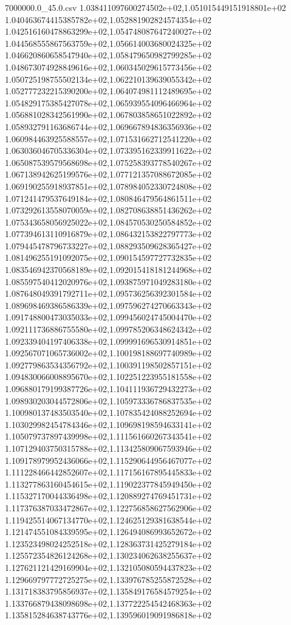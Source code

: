 \begin{filecontents*}{7000000.0_45.0.csv}
1.038411097600274502e+02,1.051015449151918801e+02
1.040463674415385782e+02,1.052881902824574354e+02
1.042516160478863299e+02,1.054748087647240027e+02
1.044568555867563759e+02,1.056614003680024325e+02
1.046620860658547940e+02,1.058479650982799285e+02
1.048673074928849616e+02,1.060345029615773456e+02
1.050725198755502134e+02,1.062210139639055342e+02
1.052777232215390200e+02,1.064074981112489695e+02
1.054829175385427078e+02,1.065939554096466964e+02
1.056881028342561990e+02,1.067803858651022892e+02
1.058932791163686744e+02,1.069667894836356936e+02
1.060984463925588557e+02,1.071531662712541220e+02
1.063036046705336304e+02,1.073395162339911622e+02
1.065087539579568698e+02,1.075258393778540267e+02
1.067138942625199576e+02,1.077121357088672085e+02
1.069190255918937851e+02,1.078984052330724808e+02
1.071241479537649184e+02,1.080846479564861511e+02
1.073292613558070059e+02,1.082708638851436262e+02
1.075343658056925022e+02,1.084570530250584852e+02
1.077394613110916879e+02,1.086432153822797773e+02
1.079445478796733227e+02,1.088293509628365427e+02
1.081496255191092075e+02,1.090154597727732835e+02
1.083546942370568189e+02,1.092015418181244968e+02
1.085597540412020976e+02,1.093875971049283180e+02
1.087648049391792711e+02,1.095736256392301584e+02
1.089698469386586339e+02,1.097596274270663343e+02
1.091748800473035033e+02,1.099456024745004470e+02
1.092111736886755580e+02,1.099785206348624342e+02
1.092339404197406338e+02,1.099991696530914851e+02
1.092567071065736002e+02,1.100198188697740989e+02
1.092779863534356792e+02,1.100391198502857151e+02
1.094830066008895670e+02,1.102251223955181558e+02
1.096880179199387726e+02,1.104111936729432273e+02
1.098930203044572806e+02,1.105973336786837535e+02
1.100980137483503540e+02,1.107835424088252694e+02
1.103029982454784346e+02,1.109698198594633141e+02
1.105079737897439998e+02,1.111561660267343541e+02
1.107129403750315788e+02,1.113425809067593946e+02
1.109178979952436066e+02,1.115290644956467077e+02
1.111228466442852607e+02,1.117156167895445833e+02
1.113277863160454615e+02,1.119022377845949450e+02
1.115327170044336498e+02,1.120889274769451731e+02
1.117376387033472867e+02,1.122756858627562906e+02
1.119425514067134770e+02,1.124625129381638544e+02
1.121474551084339595e+02,1.126494086993652672e+02
1.123523498024252518e+02,1.128363731425279184e+02
1.125572354826124268e+02,1.130234062638255637e+02
1.127621121429169904e+02,1.132105080594437823e+02
1.129669797772725275e+02,1.133976785255872528e+02
1.131718383795856937e+02,1.135849176584579254e+02
1.133766879438098698e+02,1.137722254542468363e+02
1.135815284638743776e+02,1.139596019091986818e+02

\end{filecontents*}
